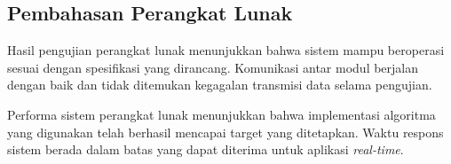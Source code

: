 
\subsection{Pembahasan Perangkat Lunak}

Hasil pengujian perangkat lunak menunjukkan bahwa sistem mampu beroperasi sesuai dengan spesifikasi yang dirancang. Komunikasi antar modul berjalan dengan baik dan tidak ditemukan kegagalan transmisi data selama pengujian.

Performa sistem perangkat lunak menunjukkan bahwa implementasi algoritma yang digunakan telah berhasil mencapai target yang ditetapkan. Waktu respons sistem berada dalam batas yang dapat diterima untuk aplikasi \emph{real-time}.
